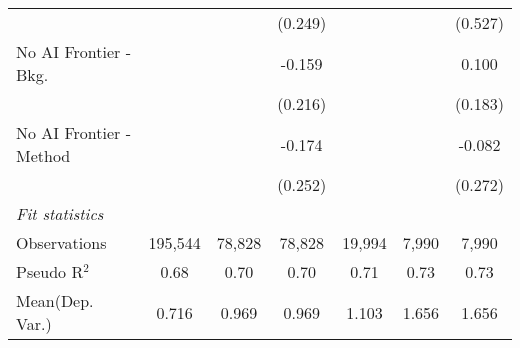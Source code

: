 \begin{tabular}{lcccccc}
                           &               &               & (0.249)       &         &         & (0.527)\\   
   No AI Frontier - Bkg.   &               &               & -0.159        &         &         & 0.100\\   
                           &               &               & (0.216)       &         &         & (0.183)\\   
   No AI Frontier - Method &               &               & -0.174        &         &         & -0.082\\   
                           &               &               & (0.252)       &         &         & (0.272)\\   
   \midrule
   \emph{Fit statistics}\\
   Observations            & 195,544       & 78,828        & 78,828        & 19,994  & 7,990   & 7,990\\  
   Pseudo R$^2$            & 0.68          & 0.70          & 0.70          & 0.71    & 0.73    & 0.73\\  
Mean(Dep. Var.) & 0.716 & 0.969 & 0.969 & 1.103 & 1.656 & 1.656 \\
   

\end{tabular}
